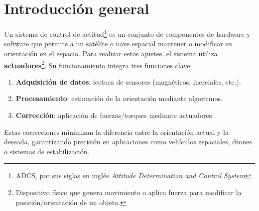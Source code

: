 
\chapter{Introducción general} %

\label{Chapter1} %
\label{IntroGeneral}
Un sistema de control de actitud\footnote{ADCS, por sus siglas en inglés \textit{Attitude Determination and Control System}} es un conjunto de componentes de hardware y software que permite a un satélite o nave espacial mantener o modificar su orientación en el espacio. Para realizar estos ajustes, el sistema utiliza \textbf{actuadores}\footnote{Dispositivo físico que genera movimiento o aplica fuerza para modificar la posición/orientación de un objeto.}. Su funcionamiento integra tres funciones clave:

\begin{enumerate}
	\item \textbf{Adquisición de datos}: lectura de sensores (magnéticos, inerciales, etc.).
	\item \textbf{Procesamiento}: estimación de la orientación mediante algoritmos.
	\item \textbf{Corrección}: aplicación de fuerzas/torques mediante actuadores.
\end{enumerate}

Estas correcciones minimizan la diferencia entre la orientación actual y la deseada, garantizando precisión en aplicaciones como vehículos espaciales, drones o sistemas de estabilización.

\newcommand{\keyword}[1]{\textbf{#1}}
\newcommand{\tabhead}[1]{\textbf{#1}}
\newcommand{\code}[1]{\texttt{#1}}
\newcommand{\file}[1]{\texttt{\bfseries#1}}
\newcommand{\option}[1]{\texttt{\itshape#1}}
\newcommand{\grados}{$^{\circ}$}




